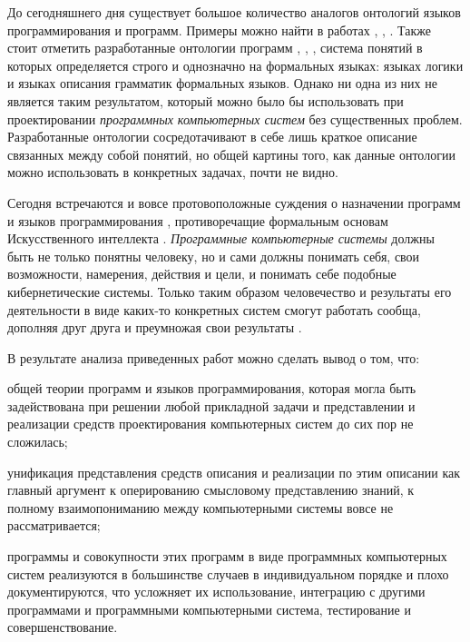 До сегодняшнего дня существует большое количество аналогов онтологий языков программирования и программ. Примеры можно найти в работах \cite{Lando2007}, \cite{Lando2009}, \cite{Turner2007}.  Также стоит отметить разработанные онтологии программ \cite{Turner2012}, \cite{Turner2014}, \cite{Jacobs2022}, система понятий в которых определяется строго и однозначно на формальных языках: языках логики и языках описания грамматик формальных языков. Однако ни одна из них не является таким результатом, который можно было бы использовать при проектировании \textit{программных компьютерных систем} без существенных проблем. Разработанные онтологии сосредотачивают в себе лишь краткое описание связанных между собой понятий, но общей картины того, как данные онтологии можно использовать в конкретных задачах, почти не видно.

Сегодня встречаются и вовсе протовоположные суждения о назначении программ и языков программирования \cite{Rapaport2020}, противоречащие формальным основам Искусственного интеллекта \cite{Grimmelmann2022}. \textit{Программные компьютерные системы} должны быть не только понятны человеку, но и сами должны понимать себя, свои возможности, намерения, действия и цели, и понимать себе подобные кибернетические системы. Только таким образом человечество и результаты его деятельности в виде каких-то конкретных систем смогут работать сообща, дополняя друг друга и преумножая свои результаты .

В результате анализа приведенных работ можно сделать вывод о том, что:
\begin{textitemize}
    \item общей теории программ и языков программирования, которая могла быть задействована при решении любой прикладной задачи и представлении и реализации средств проектирования компьютерных систем до сих пор не сложилась;
    \item унификация представления средств описания и реализации по этим описании как главный аргумент к оперированию смысловому представлению знаний, к полному взаимопониманию между компьютерными системы вовсе не рассматривается;
    \item программы и совокупности этих программ в виде программных компьютерных систем реализуются в большинстве случаев в индивидуальном порядке и плохо документируются, что усложняет их использование, интеграцию с другими программами и программными компьютерными система, тестирование и совершенствование.
\end{textitemize}

